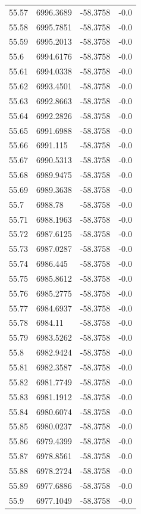 \begin{table}[H]
\begin{tabular}{llll}
55.57 & 6996.3689 & -58.3758 & -0.0 \\
55.58 & 6995.7851 & -58.3758 & -0.0 \\
55.59 & 6995.2013 & -58.3758 & -0.0 \\
55.6 & 6994.6176 & -58.3758 & -0.0 \\
55.61 & 6994.0338 & -58.3758 & -0.0 \\
55.62 & 6993.4501 & -58.3758 & -0.0 \\
55.63 & 6992.8663 & -58.3758 & -0.0 \\
55.64 & 6992.2826 & -58.3758 & -0.0 \\
55.65 & 6991.6988 & -58.3758 & -0.0 \\
55.66 & 6991.115 & -58.3758 & -0.0 \\
55.67 & 6990.5313 & -58.3758 & -0.0 \\
55.68 & 6989.9475 & -58.3758 & -0.0 \\
55.69 & 6989.3638 & -58.3758 & -0.0 \\
55.7 & 6988.78 & -58.3758 & -0.0 \\
55.71 & 6988.1963 & -58.3758 & -0.0 \\
55.72 & 6987.6125 & -58.3758 & -0.0 \\
55.73 & 6987.0287 & -58.3758 & -0.0 \\
55.74 & 6986.445 & -58.3758 & -0.0 \\
55.75 & 6985.8612 & -58.3758 & -0.0 \\
55.76 & 6985.2775 & -58.3758 & -0.0 \\
55.77 & 6984.6937 & -58.3758 & -0.0 \\
55.78 & 6984.11 & -58.3758 & -0.0 \\
55.79 & 6983.5262 & -58.3758 & -0.0 \\
55.8 & 6982.9424 & -58.3758 & -0.0 \\
55.81 & 6982.3587 & -58.3758 & -0.0 \\
55.82 & 6981.7749 & -58.3758 & -0.0 \\
55.83 & 6981.1912 & -58.3758 & -0.0 \\
55.84 & 6980.6074 & -58.3758 & -0.0 \\
55.85 & 6980.0237 & -58.3758 & -0.0 \\
55.86 & 6979.4399 & -58.3758 & -0.0 \\
55.87 & 6978.8561 & -58.3758 & -0.0 \\
55.88 & 6978.2724 & -58.3758 & -0.0 \\
55.89 & 6977.6886 & -58.3758 & -0.0 \\
55.9 & 6977.1049 & -58.3758 & -0.0 \\

\end{tabular}
\end{table}
